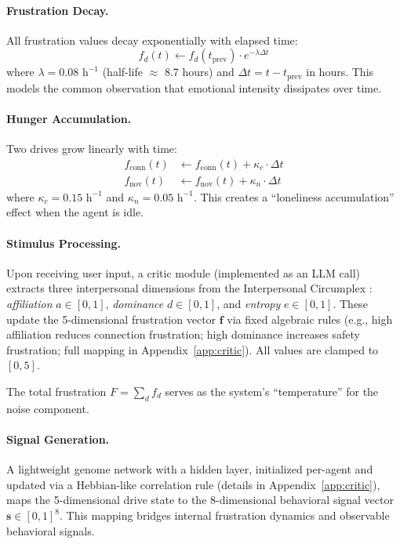 \paragraph{Frustration Decay.} All frustration values decay exponentially with elapsed time:
\begin{equation}
    f_d(t) \leftarrow f_d(t_{\text{prev}}) \cdot e^{-\lambda \Delta t}
\end{equation}
where $\lambda = 0.08 \text{ h}^{-1}$ (half-life $\approx$ 8.7 hours) and $\Delta t = t - t_{\text{prev}}$ in hours. This models the common observation that emotional intensity dissipates over time.

\paragraph{Hunger Accumulation.} Two drives grow linearly with time:
\begin{align}
    f_{\text{conn}}(t) &\leftarrow f_{\text{conn}}(t) + \kappa_c \cdot \Delta t \\
    f_{\text{nov}}(t) &\leftarrow f_{\text{nov}}(t) + \kappa_n \cdot \Delta t
\end{align}
where $\kappa_c = 0.15 \text{ h}^{-1}$ and $\kappa_n = 0.05 \text{ h}^{-1}$. This creates a ``loneliness accumulation'' effect when the agent is idle.

\paragraph{Stimulus Processing.} Upon receiving user input, a critic module (implemented as an LLM call) extracts three interpersonal dimensions from the Interpersonal Circumplex \citep{leary1957interpersonal,wiggins1979circumplex}: \emph{affiliation} $a \in [0,1]$, \emph{dominance} $d \in [0,1]$, and \emph{entropy} $e \in [0,1]$. These update the 5-dimensional frustration vector $\mathbf{f}$ via fixed algebraic rules (e.g., high affiliation reduces connection frustration; high dominance increases safety frustration; full mapping in Appendix~\ref{app:critic}). All values are clamped to $[0, 5]$.

The total frustration $F = \sum_d f_d$ serves as the system's ``temperature'' for the noise component.

\paragraph{Signal Generation.} A lightweight genome network with a hidden layer, initialized per-agent and updated via a Hebbian-like correlation rule (details in Appendix~\ref{app:critic}), maps the 5-dimensional drive state to the 8-dimensional behavioral signal vector $\mathbf{s} \in [0,1]^8$. This mapping bridges internal frustration dynamics and observable behavioral signals.

